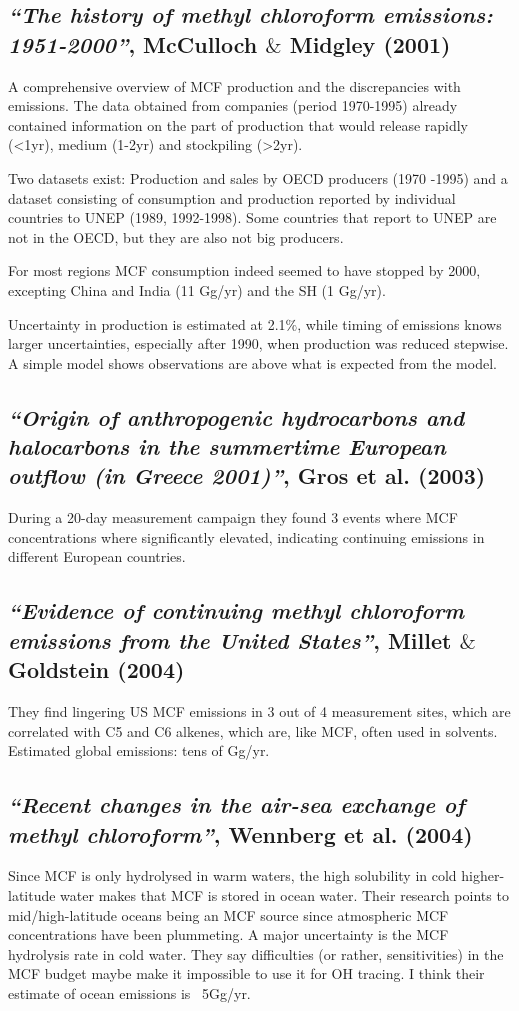 \documentclass{article}
\begin{document}
\subsection{\textit{“The history of methyl chloroform emissions: 1951-2000”}, McCulloch $\&$ Midgley (2001)}
A comprehensive overview of MCF production and the discrepancies with emissions. The data obtained from companies (period 1970-1995) already contained information on the part of production that would release rapidly (<1yr), medium (1-2yr) and stockpiling (>2yr).

Two datasets exist: Production and sales by OECD producers (1970 -1995) and a dataset consisting of consumption and production reported by individual countries to UNEP (1989, 1992-1998). Some countries that report to UNEP are not in the OECD, but they are also not big producers.

For most regions MCF consumption indeed seemed to have stopped by 2000, excepting China and India (11 Gg/yr) and the SH (1 Gg/yr).

Uncertainty in production is estimated at 2.1$\%$, while timing of emissions knows larger uncertainties, especially after 1990, when production was reduced stepwise. 
A simple model shows observations are above what is expected from the model.

\subsection{\textit{“Origin of anthropogenic hydrocarbons and halocarbons in the summertime European outflow (in Greece 2001)”},  Gros et al. (2003)}
During a 20-day measurement campaign they found 3 events where MCF concentrations where significantly elevated, indicating continuing emissions in different European countries.

\subsection{\textit{“Evidence of continuing methyl chloroform emissions from the United States”}, Millet $\&$ Goldstein (2004)}
They find lingering US MCF emissions in 3 out of 4 measurement sites, which are correlated with C5 and C6 alkenes, which are, like MCF, often used in solvents. Estimated global emissions: tens of Gg/yr.

\subsection{\textit{“Recent changes in the air-sea exchange of methyl chloroform”}, Wennberg et al. (2004)}
Since MCF is only hydrolysed in warm waters, the high solubility in cold higher-latitude water makes that MCF is stored in ocean water. Their research points to mid/high-latitude oceans being an MCF source since atmospheric MCF concentrations have been plummeting. A major uncertainty is the MCF hydrolysis rate in cold water. They say difficulties (or rather, sensitivities) in the MCF budget maybe make it impossible to use it for OH tracing. I think their estimate of ocean emissions is ~5Gg/yr.
\end{document}
